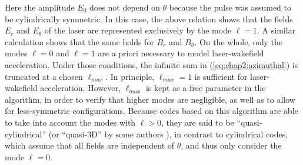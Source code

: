 \documentclass[]{report}
\begin{document}
%
Here the amplitude $E_0$ does not depend on $\theta$ because the pulse was assumed
to be cylindrically symmetric. In this case, the above relation shows
that the fields $E_r$ and $E_\theta$ of the laser are represented
exclusively by the mode $\ell = 1$. A similar calculation shows that
the same holds for $B_r$ and $B_\theta$. On the whole, only the modes
$\ell = 0$ and $\ell = 1$ are a priori necessary to model
laser-wakefield acceleration. 
Under those conditions, the infinite sum in
(\ref{eq:chap2:azimuthal}) is truncated at a chosen $\ell_{max}$. In
principle, $\ell_{max} = 1$ is sufficient for laser-wakefield
acceleration. However, $\ell_{max}$ is kept as a free parameter in the algorithm, in order to verify that
higher modes are negligible, as well as to allow for less-symmetric configurations. 
Because codes based on this algorithm are able to take into account the modes with $\ell > 0$, they are said to be
``quasi-cylindrical'' (or ``quasi-3D'' by some authors \cite{DavidsonJCP2015}), in contrast to cylindrical codes, which
assume that all fields are independent of $\theta$, and thus only
consider the mode $\ell = 0$.
\end{document}

